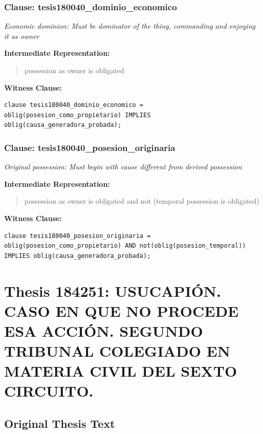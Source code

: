 \documentclass[11pt,a4paper]{article}
\begin{document}
\subsubsection{Clause: tesis180040\_dominio\_economico}

\textit{Economic dominion: Must be dominator of the thing, commanding and enjoying it as owner}

\textbf{Intermediate Representation:}

\begin{quote}
possession as owner is obligated
\end{quote}

\textbf{Witness Clause:}

\begin{lstlisting}[style=witnessstyle, language=Witness]
clause tesis180040_dominio_economico = oblig(posesion_como_propietario) IMPLIES oblig(causa_generadora_probada);
\end{lstlisting}

\subsubsection{Clause: tesis180040\_posesion\_originaria}

\textit{Original possession: Must begin with cause different from derived possession}

\textbf{Intermediate Representation:}

\begin{quote}
possession as owner is obligated and not (temporal possession is obligated)
\end{quote}

\textbf{Witness Clause:}

\begin{lstlisting}[style=witnessstyle, language=Witness]
clause tesis180040_posesion_originaria = oblig(posesion_como_propietario) AND not(oblig(posesion_temporal)) IMPLIES oblig(causa_generadora_probada);
\end{lstlisting}

\newpage

\section{Thesis 184251: USUCAPIÓN. CASO EN QUE NO PROCEDE ESA ACCIÓN. SEGUNDO TRIBUNAL COLEGIADO EN MATERIA CIVIL DEL SEXTO CIRCUITO.}
\label{thesis:184251}

\subsection{Original Thesis Text}
\end{document}
